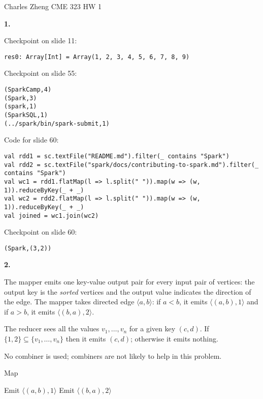 \documentclass[11pt]{article}
\begin{document}
\newcommand{\tr}{\text{tr}}
\newcommand{\E}{\textbf{E}}
\newcommand{\diag}{\text{diag}}
\newcommand{\argmax}{\text{argmax}}
\newcommand{\Cov}{\text{Cov}}
\newcommand{\Var}{\text{Var}}
\renewcommand{\thefootnote}{\fnsymbol{footnote}}

\begin{center}
\noindent Charles Zheng CME 323 HW 1
\end{center}

\noindent\textbf{1.}

Checkpoint on slide 11:
\begin{verbatim}
res0: Array[Int] = Array(1, 2, 3, 4, 5, 6, 7, 8, 9)
\end{verbatim}

Checkpoint on slide 55:
\begin{verbatim}
(SparkCamp,4)
(Spark,3)
(spark,1)
(SparkSQL,1)
(../spark/bin/spark-submit,1)
\end{verbatim}

Code for slide 60:
\begin{verbatim}
val rdd1 = sc.textFile("README.md").filter(_ contains "Spark")
val rdd2 = sc.textFile("spark/docs/contributing-to-spark.md").filter(_ contains "Spark")
val wc1 = rdd1.flatMap(l => l.split(" ")).map(w => (w, 1)).reduceByKey(_ + _)
val wc2 = rdd2.flatMap(l => l.split(" ")).map(w => (w, 1)).reduceByKey(_ + _)
val joined = wc1.join(wc2)
\end{verbatim}

Checkpoint on slide 60:
\begin{verbatim}
(Spark,(3,2))
\end{verbatim}

\noindent\textbf{2.}

The mapper emits one key-value output pair for every input pair of
vertices: the output key is the \emph{sorted} vertices and the output
value indicates the direction of the edge.  The mapper takes directed
edge $\langle a, b\rangle$: if $a < b$, it emits $\langle (a, b), 1
\rangle$ and if $a > b$, it emits $\langle (b, a), 2 \rangle$.

The reducer sees all the values $v_1, \hdots, v_n$ for a given key
$(c, d)$.  If $\{1, 2\} \subseteq \{v_1,\hdots, v_n\}$ then it emits
$(c, d)$; otherwise it emits nothing.

No combiner is used; combiners are not likely to help in this problem.

\begin{algorithm}[H]
\caption{Map}
\begin{algorithmic}
      \State Emit $\langle (a, b), 1 \rangle$
  \Else
      \State Emit $\langle (b, a), 2 \rangle$
  \EndIf
\EndFunction
\end{algorithmic}
\end{algorithm}
\end{document}
